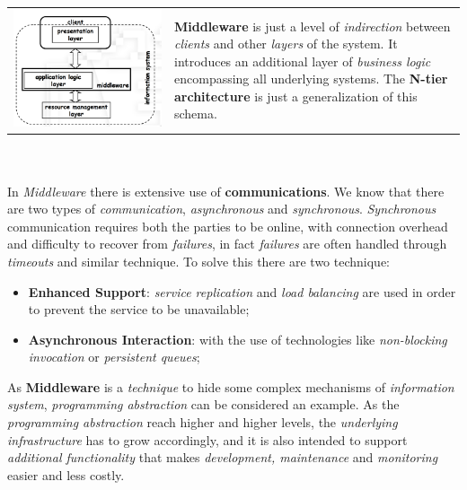 \documentclass{article}
\begin{document}
\begin{tabular}{C{4cm}  L{10cm}}
        \includegraphics[scale=0.25]{cattura4.png} &  \newline 
        \textbf{Middleware} is just a level of \emph{indirection} between \emph{clients} and other \emph{layers} of the system. It introduces an additional layer of \emph{business logic} encompassing all underlying systems. The \textbf{N-tier architecture} is just a generalization of this schema. \\
\end{tabular}\\\\
In \emph{Middleware} there is extensive use of \textbf{communications}. We know that there are two types of \emph{communication}, \emph{asynchronous} and \emph{synchronous}. \emph{Synchronous} communication requires both the parties to be online, with connection overhead and difficulty to recover from \emph{failures}, in fact \emph{failures} are often handled through \emph{timeouts} and similar technique. To solve this there are two technique:
\begin{itemize}
\item \textbf{Enhanced Support}: \emph{service replication} and\emph{ load balancing} are used in order to prevent the service to be unavailable; 
\item \textbf{Asynchronous Interaction}: with the use of technologies like \emph{non-blocking invocation} or \emph{persistent queues};
\end{itemize} 
As \textbf{Middleware} is a \emph{technique} to hide some complex mechanisms of \emph{information system}, \emph{programming abstraction} can be considered an example. As the \emph{programming abstraction} reach higher and higher levels, the \emph{underlying infrastructure} has to grow accordingly, and it is also intended to support \emph{additional functionality} that makes \emph{development, maintenance} and \emph{monitoring} easier and less costly. \\\\
\end{document}
